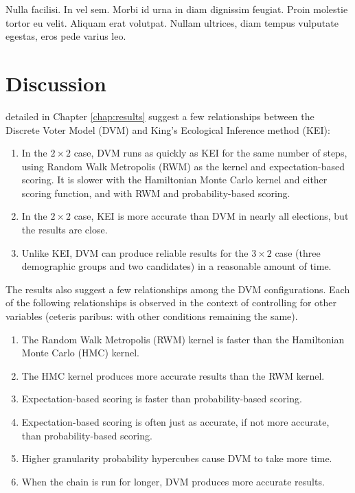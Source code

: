 \begin{savequote}[75mm]
Nulla facilisi. In vel sem. Morbi id urna in diam dignissim feugiat. Proin molestie tortor eu velit. Aliquam erat volutpat. Nullam ultrices, diam tempus vulputate egestas, eros pede varius leo.
\end{savequote}

\chapter{Discussion}
\label{chap:discussion}

 detailed in Chapter \ref{chap:results} suggest a few relationships between the Discrete Voter Model (DVM) and King's Ecological Inference method (KEI):

\begin{enumerate}
  \item In the $2 \times 2$ case, DVM runs as quickly as KEI for the same number of steps, using Random Walk Metropolis (RWM) as the kernel and expectation-based scoring. It is slower with the Hamiltonian Monte Carlo kernel and either scoring function, and with RWM and probability-based scoring.
  \item In the $2 \times 2$ case, KEI is more accurate than DVM in nearly all elections, but the results are close.
  \item Unlike KEI, DVM can produce reliable results for the $3 \times 2$ case (three demographic groups and two candidates) in a reasonable amount of time.
\end{enumerate}

The results also suggest a few relationships among the DVM configurations. Each of the following relationships is observed in the context of controlling for other variables (ceteris paribus: with other conditions remaining the same).

\begin{enumerate}
  \item The Random Walk Metropolis (RWM) kernel is faster than the Hamiltonian Monte Carlo (HMC) kernel.
  \item The HMC kernel produces more accurate results than the RWM kernel.
  \item Expectation-based scoring is faster than probability-based scoring.
  \item Expectation-based scoring is often just as accurate, if not more accurate, than probability-based scoring.
  \item Higher granularity probability hypercubes cause DVM to take more time.
  \item When the chain is run for longer, DVM produces more accurate results.
\end{enumerate}

